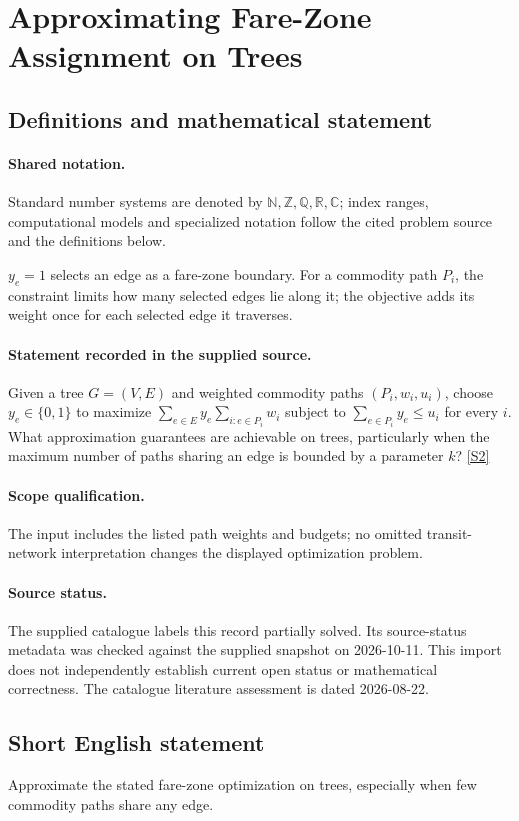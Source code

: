 \documentclass[11pt]{article}
\newcommand{\sref}[2]{\hyperlink{source:#1:#2}{[S#2]}}
\begin{document}
\section{Approximating Fare-Zone Assignment on Trees}\label{statement}

\subsection{Definitions and mathematical statement}

\paragraph{Shared notation.}Standard number systems are denoted by $\mathbb N,\mathbb Z,\mathbb Q,\mathbb R,\mathbb C$; index ranges, computational models and specialized notation follow the cited problem source and the definitions below.


$y_e=1$ selects an edge as a fare-zone boundary. For a commodity path $P_i$, the constraint limits how many selected edges lie along it; the objective adds its weight once for each selected edge it traverses.
\paragraph{Statement recorded in the supplied source.}
Given a tree $G=(V,E)$ and weighted commodity paths $(P_i,w_i,u_i)$, choose $y_e\in\{0,1\}$ to maximize $\sum_{e\in E}y_e\sum_{i:e\in P_i}w_i$ subject to $\sum_{e\in P_i}y_e\leq u_i$ for every $i$. What approximation guarantees are achievable on trees, particularly when the maximum number of paths sharing an edge is bounded by a parameter $k$? \sref{statement}{2}
\paragraph{Scope qualification.}
The input includes the listed path weights and budgets; no omitted transit-network interpretation changes the displayed optimization problem.
\paragraph{Source status.}
The supplied catalogue labels this record partially solved. Its source-status metadata was checked against the supplied snapshot on 2026-10-11. This import does not independently establish current open status or mathematical correctness. The catalogue literature assessment is dated 2026-08-22.
\subsection{Short English statement}
Approximate the stated fare-zone optimization on trees, especially when few commodity paths share any edge.
\end{document}
